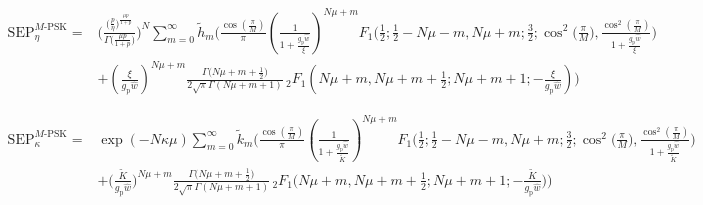 \documentclass[journal,twocolumn]{IEEEtran}
\begin{document}
\begin{figure*}[t]
\setcounter{equation}{52}
\begin{align}
     \textrm{SEP}^{M\textrm{-PSK}}_{\eta} = \ & \Bigg( \frac{\big(\frac{p}{\eta }\big)^{\frac{\mu  p}{1+p}}}{\Gamma \big(\frac{\mu  p}{1+p}\big)} \Bigg)^{N  } \sum _{m=0}^{\infty} \tilde{h}_m  \Bigg(\frac{\cos \left(\frac{\pi }{M}\right)}{\pi}\left(\frac{1}{1+\frac{g_{\textrm{p}}\hat{w}}{\xi}}\right)^{N\mu+m} F_1\Bigg(\frac{1}{2};\frac{1}{2}-N \mu-m,N \mu+ m;\frac{3}{2};\cos ^2\bigg(\frac{\pi }{M}\bigg),\frac{ \cos ^2\left(\frac{\pi }{M}\right)}{1 +\frac{g_{\textrm{p}} \hat{w}}{\xi} }\Bigg) \nonumber \\
     & +\left(\frac{\xi}{g_{\textrm{p}}\hat{w}}\right)^{N\mu+m} \frac{ \Gamma \big(N \mu + m +\frac{1}{2}\big)}{2\sqrt{\pi}\Gamma (N \mu + m +1)} \, _2F_1\left(N \mu+m,N \mu+m+\frac{1}{2};N \mu+m+1;-\frac{\xi}{g_{\textrm{p}}\hat{w}}\right)\Bigg) \label{eq:eta:psk-2}
\end{align}
\vspace{-1mm}
\hrulefill
\vspace{-2mm}
\end{figure*}
%
\begin{figure*}[t]
\setcounter{equation}{54}
\begin{align}
     \textrm{SEP}^{M\textrm{-PSK}}_{\kappa} = \ & \exp(-N\kappa\mu) \sum _{m=0}^{\infty} \tilde{k}_m  \Bigg(\frac{\cos \left(\frac{\pi }{M}\right)}{\pi}\left(\frac{1}{1+\frac{g_{\textrm{p}}\hat{w}}{\tilde{K}}}\right)^{N\mu+m} F_1\Bigg(\frac{1}{2};\frac{1}{2}-N \mu-m,N \mu+ m;\frac{3}{2};\cos ^2\bigg(\frac{\pi }{M}\bigg),\frac{ \cos ^2\left(\frac{\pi }{M}\right)}{1 +\frac{g_{\textrm{p}} \hat{w}}{\tilde{K}} }\Bigg) \nonumber \\
     & +\bigg(\frac{\tilde{K}}{g_{\textrm{p}}\hat{w}}\bigg)^{N\mu+m} \frac{ \Gamma \big(N \mu + m +\frac{1}{2}\big)}{2\sqrt{\pi}\Gamma (N \mu + m +1)} \, _2F_1\bigg(N \mu+m,N \mu+m+\frac{1}{2};N \mu+m+1;-\frac{\tilde{K}}{g_{\textrm{p}}\hat{w}}\bigg)\Bigg) \label{eq:kappa:psk-2}
\end{align}
\setcounter{equation}{46}
\vspace{-1mm}
\hrulefill
\vspace{-2mm}
\end{figure*}
\end{document}
